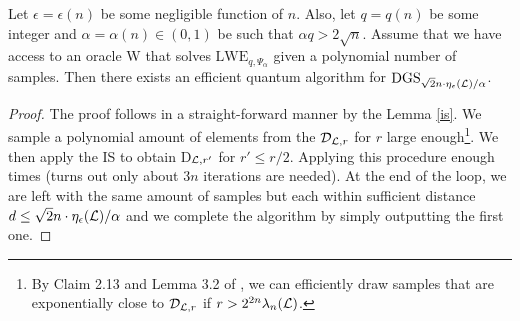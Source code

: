 \begin{theorem}\label{heart}
        Let $\epsilon = \epsilon(n)$ be some negligible function of $n$. Also, let $q = q(n)$ be some integer and $\alpha = \alpha(n) \in (0, 1)$ be such that $\alpha q > 2\sqrt{n}$. Assume that we have access to an oracle W that solves $\text{LWE}_{q,\Psi_{\alpha}}$ given a polynomial number of samples. Then there exists an efficient quantum algorithm for $\text{DGS}_{\sqrt{2}n \cdot \eta_{\epsilon}(\mathcal{L})/\alpha}$.
\end{theorem}
\begin{proof}
        The proof follows in a straight-forward manner by the Lemma \ref{is}. We sample a polynomial amount of elements from the $\mathcal{D}_{\mathcal{L}, r}$ for $r$ large enough\footnote{By Claim 2.13 and Lemma 3.2 of \cite{regev}, we can efficiently draw samples that are exponentially close to $\mathcal{D}_{\mathcal{L}, r}$ if $r > 2^{2n} \lambda_n(\mathcal{L})$.}. We then apply the IS to obtain D$_{\mathcal{L}, r'}$ for $r' \leq r/2$. Applying this procedure enough times (turns out only about $3n$ iterations are needed). At the end of the loop, we are left with the same amount of samples but each within sufficient distance $d \leq \sqrt{2}n \cdot \eta_{\epsilon}(\mathcal{L})/\alpha$ and we complete the algorithm by simply outputting the first one.
\end{proof}

